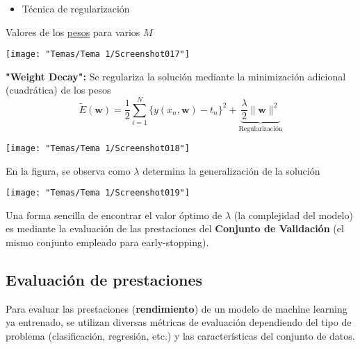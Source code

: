 \hspace{1cm}

\begin{itemize}[label=\color{red}\textbullet, leftmargin=*]
	\item \color{lightblue}Técnica de regularización
\end{itemize}
Valores de los \underline{pesos} para varios $M$
\begin{center}
	\texttt{[image: "Temas/Tema 1/Screenshot017"]}
\end{center}
\textbf{"Weight Decay":} Se regulariza la solución mediante la minimización adicional (cuadrática) de los pesos \[ \tilde{E}(\mathbf{w})=\dfrac{1}{2}\sum_{i=1}^{N}\{y(x_n,\mathbf{w})-t_n\}^2+\underbrace{\dfrac{\lambda}{2}\|\mathbf{w}\|^2}_{\text{Regularización}} \]
\begin{center}
	\texttt{[image: "Temas/Tema 1/Screenshot018"]}
\end{center}
\begin{minipage}{0.5\textwidth}
	En la figura, se observa como $\lambda$ determina la generalización de la solución
\end{minipage}\qquad\begin{minipage}{0.45\textwidth}
\begin{center}
	\texttt{[image: "Temas/Tema 1/Screenshot019"]}
\end{center}
\end{minipage}

Una forma sencilla de encontrar el valor óptimo de $\lambda$ (la complejidad del modelo) es mediante la evaluación de las prestaciones del \textbf{Conjunto de Validación} (el mismo conjunto empleado para early-stopping).
\subsection{Evaluación de prestaciones}
Para evaluar las prestaciones (\textbf{rendimiento}) de un modelo de machine learning ya entrenado, se utilizan diversas métricas de evaluación dependiendo del tipo de problema (clasificación, regresión, etc.) y las características del conjunto de datos.

